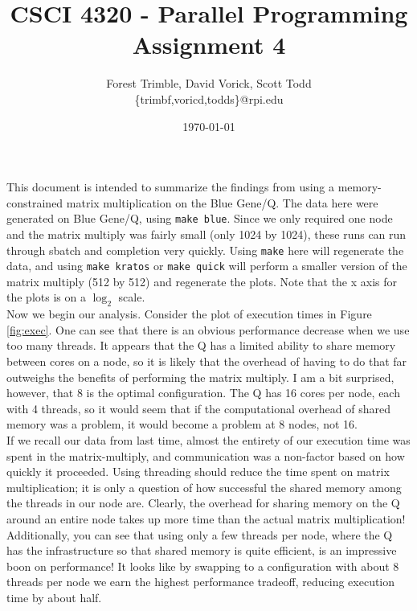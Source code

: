 \documentclass[twocolumn]{article}
\title{CSCI 4320 - Parallel Programming\\Assignment 4}
\author{Forest Trimble, David Vorick, Scott Todd\\\{trimbf,voricd,todds\}@rpi.edu}
\date{\today}
\begin{document}
\maketitle

\pagestyle{fancy}
\fancyhead{}
\fancyhead[R]{\today}

This document is intended to summarize the findings from using a 
memory-constrained matrix multiplication on the Blue Gene/Q. The data here were 
generated on Blue Gene/Q, using \texttt{make blue}. Since we only required one 
node and the matrix multiply was fairly small (only 1024 by 1024), these runs
can run through sbatch and completion very quickly. Using \texttt{make} here will
regenerate the data, and using \texttt{make kratos} or \texttt{make quick} 
will perform a smaller version of the matrix multiply (512 by 512) and regenerate
the plots. Note that the x axis for the plots is on a $\log_2$ scale.\\

Now we begin our analysis. Consider the plot of execution times in Figure 
\ref{fig:exec}. One can see that there is an obvious performance decrease when we
use too many threads. It appears that the Q has a limited ability to share memory 
between cores on a node, so it is likely that the overhead of having to do that 
far outweighs the benefits of performing the matrix multiply. I am a bit surprised,
however, that 8 is the optimal configuration. The Q has 16 cores per node, each with
4 threads, so it would seem that if the computational overhead of shared memory was
a problem, it would become a problem at 8 nodes, not 16. \\

If we recall our data from last time, almost the entirety of our 
execution time was spent in the matrix-multiply, and communication was a 
non-factor based on how quickly it proceeded. Using threading should reduce the 
time spent on matrix multiplication; it is only a question of how successful the
shared memory among the threads in our node are. Clearly, the overhead for sharing
memory on the Q around an entire node takes up more time than the actual matrix 
multiplication! Additionally, you can see that using only a few threads per node, 
where the Q has the infrastructure so that shared memory is quite efficient, is an
impressive boon on performance! It looks like by swapping to a configuration with
about 8 threads per node we earn the highest performance tradeoff, reducing 
execution time by about half. \\
\end{document}
